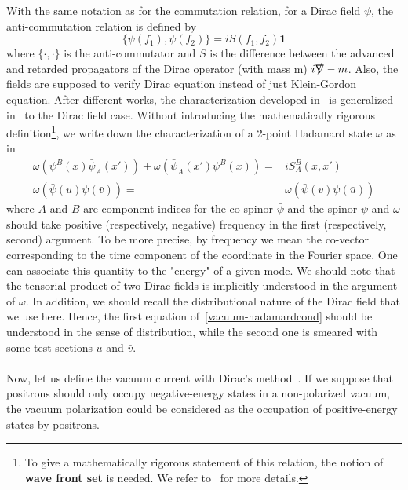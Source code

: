 With the same notation as for the commutation relation, 
for a Dirac field $\psi$, the anti-commutation relation is defined by
\begin{equation*}
\{\psi(f_1), \psi(f_2)\} = i S(f_1, f_2) \mathbf{1}
\end{equation*}
where $\{\cdot, \cdot\}$ is the anti-commutator and $S$ is the difference between the advanced and retarded propagators of the Dirac operator (with mass m) $i\slashed{\nabla} - m$.
Also, the fields are supposed to verify Dirac equation instead of just Klein-Gordon equation.
After different works, the characterization developed in~\cite{Radzikowski1996} is generalized in~\cite{Sahlmann2000} to the Dirac field case.
Without introducing the mathematically rigorous definition\footnote{
To give a mathematically rigorous statement of this relation, 
the notion of \textbf{wave front set} is needed. 
We refer to~\cite{Radzikowski1996} for more details.
}, 
we write down the characterization of a 2-point Hadamard state $\omega$ as in~\cite{Zahn2015}
\begin{equation}\label{vacuum-hadamardcond}
\begin{split}
\omega(\psi^B(x)\bar{\psi}_A(x')) + \omega(\bar{\psi}_A(x')\psi^B(x)) = &
iS^B_A(x,x') \\
\overline{\omega(\bar{\psi}(u)\psi(\bar{v}))} = & \omega(\bar{\psi}(v)\psi(\bar{u}))
\end{split}
\end{equation}
where $A$ and $B$ are component indices for the co-spinor $\bar{\psi}$ and the spinor $\psi$ and $\omega$ should take positive (respectively, negative) frequency in the first (respectively, second) argument.
To be more precise, 
by frequency we mean the co-vector corresponding to the time component of the coordinate in the Fourier space.
One can associate this quantity to the "energy" of a given mode. 
We should note that the tensorial product of two Dirac fields is implicitly understood in the argument of $\omega$. 
In addition, we should recall the distributional nature of the Dirac field that we use here. 
Hence, the first equation of~\cref{vacuum-hadamardcond} should be understood in the sense of distribution,
while the second one is smeared with some test sections $u$ and $\bar{v}$. \\\\
Now, let us define the vacuum current with Dirac's method~\cite{Dirac1934}.
If we suppose that positrons should only occupy negative-energy states in a non-polarized vacuum, 
the vacuum polarization could be considered as the occupation of positive-energy states by positrons. 
